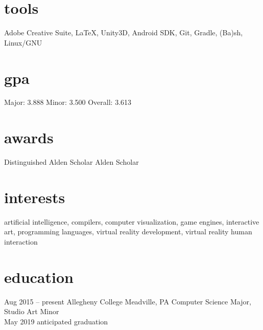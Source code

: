 \documentclass[]{friggeri-cv}
\begin{document}
\begin{aside}
  \section{tools}\vspace{0.05cm}
    Adobe Creative Suite, \LaTeX , Unity3D, Android SDK, Git, Gradle, (Ba)sh, Linux/GNU
  \section{gpa}\vspace{0.1cm}
  	Major: 3.888
  	Minor: 3.500
    Overall: 3.613\vspace{0.1cm}
  \section{awards}\vspace{0.05cm}
  Distinguished Alden Scholar\vspace{0.1cm}
  Alden Scholar\vspace{0.1cm}
\end{aside}

\section{interests}

artificial intelligence, compilers, computer visualization, game engines, interactive art, programming languages, virtual reality development, virtual reality human interaction

\section{education}
\begin{entrylist}
  \entry
    {Aug 2015 -- present}
    {Allegheny College}
    {Meadville, PA}
    {Computer Science Major, Studio Art Minor\\May 2019 anticipated graduation}
\end{entrylist}
\end{document}
